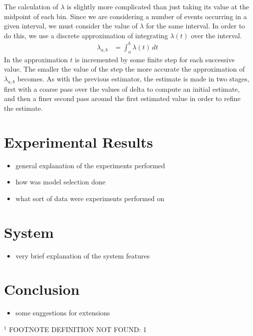 \documentclass[11pt]{article}
\begin{document}
   The calculation of $\lambda$ is slightly more complicated than just taking
   its value at the midpoint of each bin. Since we are considering a number of
   events occurring in a given interval, we must consider the value of $\lambda$
   for the same interval. In order to do this, we use a discrete approximation
   of integrating $\lambda(t)$ over the interval.
   \begin{align}
   \lambda_{a,b}&=\int_a^b\lambda(t)\,dt
   \end{align}
   In the approximation $t$ is incremented by some finite step for each
   successive value. The smaller the value of the step the more accurate the
   approximation of $\lambda_{a,b}$ becomes. As with the previous estimator, the
   estimate is made in two stages, first with a coarse pass over the values of
   delta to compute an initial estimate, and then a finer second pass around the
   first estimated value in order to refine the estimate. 
\section{Experimental Results}
\label{sec-6}

\begin{itemize}
\item general explanation of the experiments performed
\item how was model selection done
\item what sort of data were experiments performed on
\end{itemize}
\section{System}
\label{sec-7}

\begin{itemize}
\item very brief explanation of the system features
\end{itemize}
\section{Conclusion}
\label{sec-8}

\begin{itemize}
\item some suggestions for extensions
    \printbibliography
\end{itemize}
$^{1}$ FOOTNOTE DEFINITION NOT FOUND: 1
\end{document}
